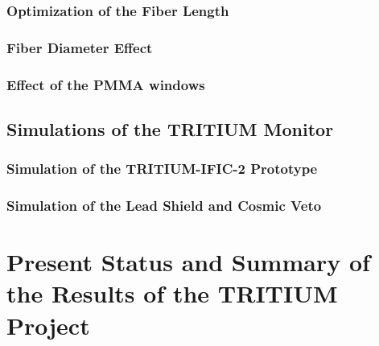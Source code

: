 \documentclass[12pt,a4paper]{book}
\begin{document}
		\subsection[Optimization of the Fiber Length]{Optimization of the Fiber Length}\label{subsec:FiberLengthSimulation}
		
				
		\subsection[Fiber Diameter]{Fiber Diameter Effect}\label{subsec:FiberDiameterSimulation}
		
		
		\subsection[Effect of the PMMA windows]{Effect of the PMMA windows}\label{subsec:PMMAWindowsSimulation}
			
						
	\section{Simulations of the TRITIUM Monitor}\label{sec:TRITIUMMonitorSimulation}
	
		
		\subsection{Simulation of the TRITIUM-IFIC-2 Prototype}\label{subsec:TritiumIFIC2Simulation}
		
		
		\subsection[Lead Shield and Cosmic Veto]{Simulation of the Lead Shield and Cosmic Veto}\label{subsec:LeadCosmicSimulation}
		
		\newpage
		
\fancyhead[LE]{\leftmark}

\chapter{Present Status and Summary of the Results of the TRITIUM Project}  \label{chap:Summary}

\newpage
\end{document}
